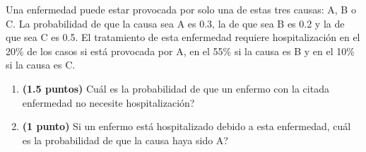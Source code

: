 
Una enfermedad puede estar provocada por solo una de estas tres causas: A, B o C. La probabilidad de que la causa sea A es 0.3, la de que sea B es 0.2 y la de que sea C es 0.5. El tratamiento de esta enfermedad requiere hospitalización en el 20\% de los casos si está provocada por A, en el 55\% si la causa es B y en el 10\% si la causa es C.
\begin{enumerate}[label=\alph*)]
\item \textbf{(1.5 puntos)} \textquestiondown{}Cuál es la probabilidad de que un enfermo con la citada enfermedad no necesite hospitalización?
\item \textbf{(1 punto)} Si un enfermo está hospitalizado debido a esta enfermedad, \textquestiondown{}cuál es la probabilidad de que la causa haya sido A?
\end{enumerate}

